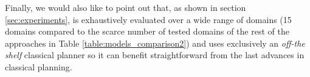 Finally, we would also like to point out that, as shown in section \ref{sec:experiments}, \FAMA is exhaustively evaluated over a wide range of domains (15 domains compared to the scarce number of tested domains of the rest of the approaches in Table \ref{table:models_comparison2}) and uses exclusively an \emph{off-the shelf} classical planner so it can benefit straightforward from the last advances in classical planning.




























